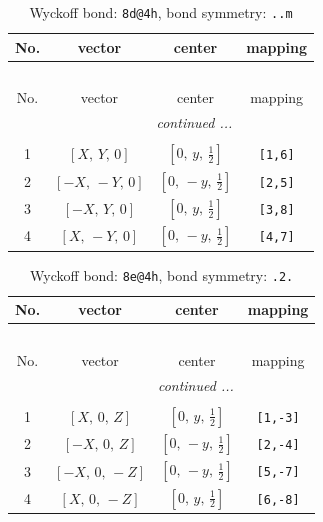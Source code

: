 \documentclass[fleqn,8pt]{jsarticle}
\begin{document}
\begin{longtable}{cccc}
\caption{Wyckoff bond: {\tt 8d@4h}, bond symmetry: {\tt ..m}}
 \\
 \hline \hline
No. & vector & center & mapping \\ \hline \endfirsthead

\multicolumn{3}{l}{\tablename\ \thetable{}} \\
 \hline \hline
No. & vector & center & mapping \\ \hline \endhead

 \hline \hline
\multicolumn{3}{r}{\footnotesize\it continued ...} \\ \endfoot

 \hline \hline
\multicolumn{3}{r}{} \\ \endlastfoot

1 & $\left[ X,\, Y,\, 0 \right]$ & $\left[ 0,\, y,\, \frac{1}{2} \right]$ & {\tt [1,6]} \\ \hline
2 & $\left[ - X,\, - Y,\, 0 \right]$ & $\left[ 0,\, - y,\, \frac{1}{2} \right]$ & {\tt [2,5]} \\ \hline
3 & $\left[ - X,\, Y,\, 0 \right]$ & $\left[ 0,\, y,\, \frac{1}{2} \right]$ & {\tt [3,8]} \\ \hline
4 & $\left[ X,\, - Y,\, 0 \right]$ & $\left[ 0,\, - y,\, \frac{1}{2} \right]$ & {\tt [4,7]} \\
\end{longtable}
\renewcommand{\arraystretch}{1.2}
\begin{longtable}{cccc}
\caption{Wyckoff bond: {\tt 8e@4h}, bond symmetry: {\tt .2.}}
 \\
 \hline \hline
No. & vector & center & mapping \\ \hline \endfirsthead

\multicolumn{3}{l}{\tablename\ \thetable{}} \\
 \hline \hline
No. & vector & center & mapping \\ \hline \endhead

 \hline \hline
\multicolumn{3}{r}{\footnotesize\it continued ...} \\ \endfoot

 \hline \hline
\multicolumn{3}{r}{} \\ \endlastfoot

1 & $\left[ X,\, 0,\, Z \right]$ & $\left[ 0,\, y,\, \frac{1}{2} \right]$ & {\tt [1,-3]} \\ \hline
2 & $\left[ - X,\, 0,\, Z \right]$ & $\left[ 0,\, - y,\, \frac{1}{2} \right]$ & {\tt [2,-4]} \\ \hline
3 & $\left[ - X,\, 0,\, - Z \right]$ & $\left[ 0,\, - y,\, \frac{1}{2} \right]$ & {\tt [5,-7]} \\ \hline
4 & $\left[ X,\, 0,\, - Z \right]$ & $\left[ 0,\, y,\, \frac{1}{2} \right]$ & {\tt [6,-8]} \\
\end{longtable}
\end{document}
